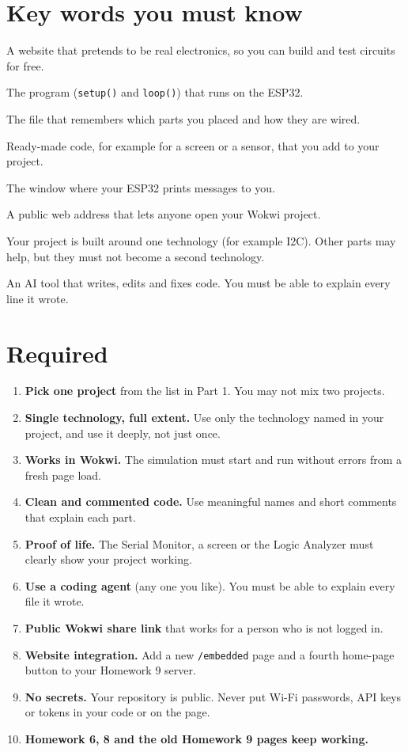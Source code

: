 \documentclass[11pt,a4paper]{article}
\begin{document}
\section*{Key words you must know}
\begin{description}[leftmargin=1.2cm,style=nextline]
\item[Simulator (Wokwi)] A website that pretends to be real electronics, so you can build and test circuits for free.
\item[Sketch] The program (\texttt{setup()} and \texttt{loop()}) that runs on the ESP32.
\item[Circuit diagram (\texttt{diagram.json})] The file that remembers which parts you placed and how they are wired.
\item[Library] Ready-made code, for example for a screen or a sensor, that you add to your project.
\item[Serial Monitor] The window where your ESP32 prints messages to you.
\item[Share link] A public web address that lets anyone open your Wokwi project.
\item[Single technology rule] Your project is built around one technology (for example I2C). Other parts may help, but they must not become a second technology.
\item[Coding agent] An AI tool that writes, edits and fixes code. You must be able to explain every line it wrote.
\end{description}

\section*{Required}
\begin{enumerate}
\item \textbf{Pick one project} from the list in Part 1. You may not mix two projects.
\item \textbf{Single technology, full extent.} Use only the technology named in your project, and use it deeply, not just once.
\item \textbf{Works in Wokwi.} The simulation must start and run without errors from a fresh page load.
\item \textbf{Clean and commented code.} Use meaningful names and short comments that explain each part.
\item \textbf{Proof of life.} The Serial Monitor, a screen or the Logic Analyzer must clearly show your project working.
\item \textbf{Use a coding agent} (any one you like). You must be able to explain every file it wrote.
\item \textbf{Public Wokwi share link} that works for a person who is not logged in.
\item \textbf{Website integration.} Add a new \texttt{/embedded} page and a fourth home-page button to your Homework 9 server.
\item \textbf{No secrets.} Your repository is public. Never put Wi-Fi passwords, API keys or tokens in your code or on the page.
\item \textbf{Homework 6, 8 and the old Homework 9 pages keep working.}
\end{enumerate}
\end{document}
